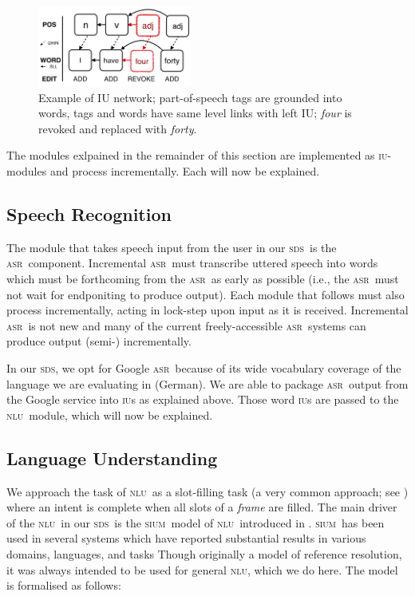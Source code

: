 \documentclass[11pt]{article}
\newcommand{\sds}[0]{\textsc{sds}}
\newcommand{\nlu}[0]{\textsc{nlu}}
\newcommand{\sium}[0]{\textsc{sium}}
\newcommand{\asr}[0]{\textsc{asr}}
\newcommand{\iu}[0]{\textsc{iu}}
\begin{document}
\begin{figure} %
  \centering
      \includegraphics[width=0.45\textwidth]{figures/005_iu_example.png}	
      \caption{Example of IU network; part-of-speech tags are grounded into words, tags and words have same level links with left IU; \emph{four} is revoked and replaced with \emph{forty}.\label{fig:iu_example}}
            \vspace{-0.25cm}
\end{figure}

The modules exlpained in the remainder of this section are implemented as \iu-modules and process incrementally. Each will now be explained. 

\subsection{Speech Recognition}

The module that takes speech input from the user in our \sds\ is the \asr\ component. Incremental \asr\ must transcribe uttered speech into words which must be forthcoming from the \asr\ as early as possible (i.e., the \asr\ must not wait for endponiting to produce output). Each module that follows must also process incrementally, acting in lock-step upon input as it is received. Incremental \asr\ is not new \cite{baumannetal2009:naacl} and many of the current freely-accessible \asr\ systems can produce output (semi-) incrementally. 

In our \sds, we opt for Google \asr\ because of its wide vocabulary coverage of the language we are evaluating in (German). We are able to package \asr\ output from the Google service into \iu s as explained above. Those word \iu s are passed to the \nlu\ module, which will now be explained. 

\subsection{Language Understanding}

We approach the task of \nlu\ as a slot-filling task (a very common approach; see ) where an intent is complete when all slots of a \emph{frame} are filled. The main driver of the \nlu\ in our \sds\ is the \sium\ model of \nlu\ introduced in . \sium\ has been used in several systems which have reported substantial results in various domains, languages, and tasks \cite{Kennington2014_coling,Kennington2015_naacl,Kennington2016} Though originally a model of reference resolution, it was always intended to be used for general \nlu, which we do here. The model is formalised as follows:
\end{document}
